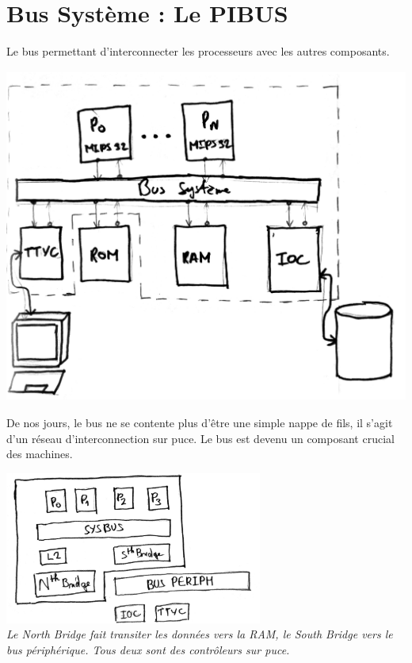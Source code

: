 
\section{Bus Système : Le PIBUS}

Le bus permettant d'interconnecter les processeurs avec les autres composants.
\begin{center}
  \includegraphics[height=11cm]{cours2/pics/bus.jpg}
\end{center}
De nos jours, le bus ne se contente plus d'être une simple nappe de fils, il s'agit d'un
réseau d'interconnection sur puce. Le bus est devenu un composant crucial des
machines.
\begin{center}
  \includegraphics[height=5cm]{cours2/pics/modern.jpg}\\
  {\it Le North Bridge fait transiter les données vers la RAM, le South Bridge
  vers le bus périphérique. Tous deux sont des contrôleurs sur puce.}
\end{center}

